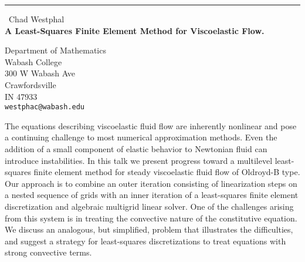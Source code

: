 \documentclass{report}
\begin{document}
\begin{center}
\rule{6in}{1pt} \
{\large Chad Westphal \\
{\bf A Least-Squares Finite Element Method for Viscoelastic Flow.}}

Department of Mathematics \\ Wabash College \\ 300 W Wabash Ave \\ Crawfordsville \\ IN 47933
\\
{\tt westphac@wabash.edu}\end{center}

The equations describing viscoelastic fluid flow are inherently nonlinear
and pose a continuing challenge to most numerical approximation methods.
Even the addition of a small component of elastic behavior to Newtonian
fluid can introduce instabilities. In this talk we present progress
toward a multilevel least-squares finite element method for steady
viscoelastic fluid flow of Oldroyd-B type. Our approach is to combine an
outer iteration consisting of linearization steps on a nested sequence of
grids with an inner iteration of a least-squares finite element
discretization and algebraic multigrid linear solver. One of the
challenges arising from this system is in treating the convective nature
of the constitutive equation. We discuss an analogous, but simplified,
problem that illustrates the difficulties, and suggest a strategy for
least-squares discretizations to treat equations with strong convective
terms.
\end{document}
